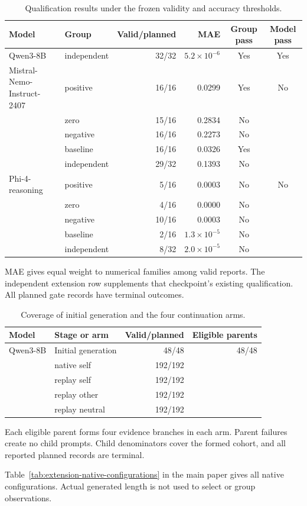
\begin{table}[t]
\centering
\begin{tabular}{@{}llrrcc@{}}
\toprule
Model & Group & Valid/planned & MAE & Group pass & Model pass \\
\midrule
Qwen3-8B & independent & 32/32 & $5.2\!\times\!10^{-6}$ & Yes & Yes \\
\midrule
Mistral-Nemo-Instruct-2407 & positive & 16/16 & 0.0299 & Yes & No \\
 & zero & 15/16 & 0.2834 & No &  \\
 & negative & 16/16 & 0.2273 & No &  \\
 & baseline & 16/16 & 0.0326 & Yes &  \\
 & independent & 29/32 & 0.1393 & No &  \\
\midrule
Phi-4-reasoning & positive & 5/16 & 0.0003 & No & No \\
 & zero & 4/16 & 0.0000 & No &  \\
 & negative & 10/16 & 0.0003 & No &  \\
 & baseline & 2/16 & $1.3\!\times\!10^{-5}$ & No &  \\
 & independent & 8/32 & $2.0\!\times\!10^{-5}$ & No &  \\
\bottomrule
\end{tabular}
\caption{Qualification results under the frozen validity and accuracy thresholds.}
\label{tab:extension-qualification}
\end{table}
MAE gives equal weight to numerical families among valid reports. The independent extension row supplements that checkpoint's existing qualification. All planned gate records have terminal outcomes.

\begin{table}[t]
\centering
\begin{tabular}{@{}llrr@{}}
\toprule
Model & Stage or arm & Valid/planned & Eligible parents \\
\midrule
Qwen3-8B & Initial generation & 48/48 & 48/48 \\
 & native self & 192/192 &  \\
 & replay self & 192/192 &  \\
 & replay other & 192/192 &  \\
 & replay neutral & 192/192 &  \\
\bottomrule
\end{tabular}
\caption{Coverage of initial generation and the four continuation arms.}
\label{tab:extension-history-coverage}
\end{table}
Each eligible parent forms four evidence branches in each arm. Parent failures create no child prompts. Child denominators cover the formed cohort, and all reported planned records are terminal.

Table~\ref{tab:extension-native-configurations} in the main paper gives all native configurations. Actual generated length is not used to select or group observations.
